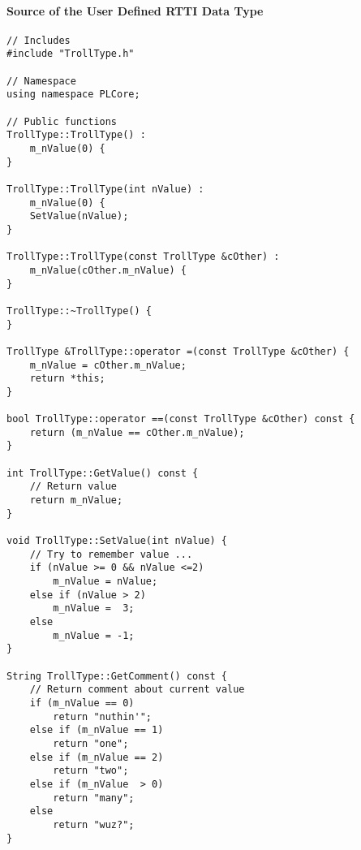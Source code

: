 \paragraph{Source of the User Defined \ac{RTTI} Data Type}
\begin{lstlisting}[label=Code:UserDefinedRTTIDataTypeSource,caption={Source of the user defined \ac{RTTI} data type}]
// Includes
#include "TrollType.h"

// Namespace
using namespace PLCore;

// Public functions
TrollType::TrollType() :
	m_nValue(0) {
}

TrollType::TrollType(int nValue) :
	m_nValue(0) {
	SetValue(nValue);
}

TrollType::TrollType(const TrollType &cOther) :
	m_nValue(cOther.m_nValue) {
}

TrollType::~TrollType() {
}

TrollType &TrollType::operator =(const TrollType &cOther) {
	m_nValue = cOther.m_nValue;
	return *this;
}

bool TrollType::operator ==(const TrollType &cOther) const {
	return (m_nValue == cOther.m_nValue);
}

int TrollType::GetValue() const {
	// Return value
	return m_nValue;
}

void TrollType::SetValue(int nValue) {
	// Try to remember value ...
	if (nValue >= 0 && nValue <=2)
		m_nValue = nValue;
	else if (nValue > 2)
		m_nValue =  3;
	else
		m_nValue = -1;
}

String TrollType::GetComment() const {
	// Return comment about current value
	if (m_nValue == 0)
		return "nuthin'";
	else if (m_nValue == 1)
		return "one";
	else if (m_nValue == 2)
		return "two";
	else if (m_nValue  > 0)
		return "many";
	else
		return "wuz?";
}
\end{lstlisting}

